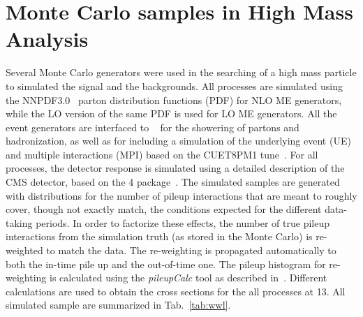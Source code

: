 \section{Monte Carlo samples in High Mass Analysis}
\label{MSsample}
Several  Monte Carlo  generators were used in the searching of a high mass particle to simulated the signal and the backgrounds. 
All processes are simulated using the NNPDF3.0~\cite{Ball:2013hta,Ball:2011uy} parton distribution functions (PDF) for NLO ME generators,
while the LO version of the same PDF is used for LO ME generators. All the event generators are interfaced 
to ~\cite{Sjostrand:2007gs} for the showering of
partons and hadronization, as well as for including a simulation of the underlying event (UE) and multiple interactions (MPI)
based on the CUET8PM1 tune~\cite{Khachatryan:2015pea}. 
For all processes, the detector response is simulated using a detailed
description of the CMS detector, based on the \GEANT{}4 package~\cite{Agostinelli:2002hh}. 
The simulated samples are generated with distributions for the number of pileup interactions that are meant to roughly cover,
though not exactly match, the conditions expected for the different data-taking periods. In order to factorize these effects, 
the number of true pileup interactions from the simulation truth (as stored in the Monte Carlo)
is re-weighted to match the data.
The re-weighting is propagated automatically to both the in-time pile up and the out-of-time one.
The pileup histogram for re-weighting is calculated using the \emph{pileupCalc} tool as described in~\cite{puJSON}. 
Different calculations are used to obtain the cross sections for the all processes at 13\TeV. 
All simulated sample are summarized in Tab.~\ref{tab:wwl}.



